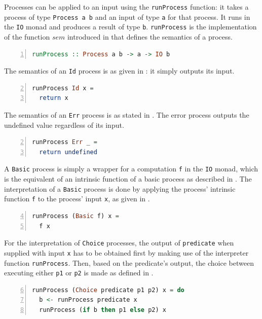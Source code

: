 Processes can be applied to an input using the \texttt{runProcess} function: it takes a process of type \texttt{Process a b} and an input of type \texttt{a} for that process. It runs in the \texttt{IO} monad and produces a result of type \texttt{b}. \texttt{runProcess} is the implementation of the function $sem$ introduced in  that defines the semantics of a process.
\begin{lstlisting}[language=Haskell,caption=Signature of the process interpreter.,label=lst:local_runprocess_signature,numbers=left,frame=bt]
runProcess :: Process a b -> a -> IO b
\end{lstlisting}

The semantics of an \texttt{Id} process is as given in : it simply outputs its input.
\begin{lstlisting}[language=Haskell,caption=Implementation of the interpreter of \texttt{Id} processes.,label=lst:local_runprocess_const,numbers=left,frame=bt,firstnumber=2]
runProcess Id x =
  return x
\end{lstlisting}

The semantics of an \texttt{Err} process is as stated in . The error process outputs the undefined value regardless of its input.
\begin{lstlisting}[language=Haskell,caption=Implementation of the interpreter of \texttt{Id} processes.,label=lst:local_runprocess_const,numbers=left,frame=bt,firstnumber=2]
runProcess Err _ =
  return undefined
\end{lstlisting}

A \texttt{Basic} process is simply a wrapper for a computation \texttt{f} in the \texttt{IO} monad, which is the equivalent of an intrinsic function of a basic process as described in . The interpretation of a \texttt{Basic} process is done by applying the process' intrinsic function \texttt{f} to the process' input \texttt{x}, as given in .
\begin{lstlisting}[language=Haskell,caption=Implementation of the interpreter for \texttt{Basic} processes.,label=lst:local_runprocess_simple,numbers=left,frame=bt,firstnumber=4]
runProcess (Basic f) x =
  f x
\end{lstlisting}

For the interpretation of \texttt{Choice} processes, the output of \texttt{predicate} when supplied with input \texttt{x} has to be obtained first by making use of the interpreter function \texttt{runProcess}. Then, based on the predicate's output, the choice between executing either \texttt{p1} or \texttt{p2} is made as defined in .
\begin{lstlisting}[language=Haskell,caption=Implementation of the interpreter for \texttt{Choice} processes.,label=lst:local_runprocess_choice,numbers=left,frame=bt,firstnumber=6]
runProcess (Choice predicate p1 p2) x = do
  b <- runProcess predicate x
  runProcess (if b then p1 else p2) x
\end{lstlisting}

